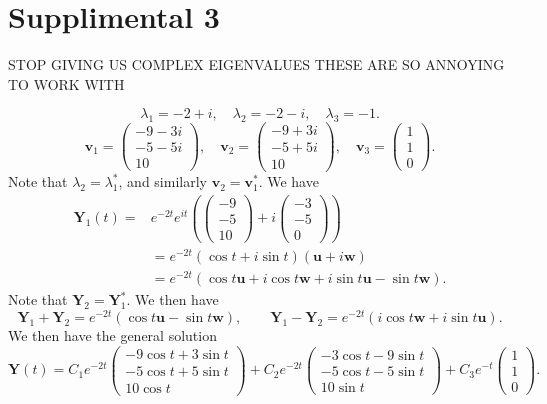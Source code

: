 \documentclass[11pt, letterpaper]{report}
\begin{document}
\section*{Supplimental 3}
STOP GIVING US COMPLEX EIGENVALUES THESE ARE SO ANNOYING TO WORK WITH

\[
	\lambda_1=-2+i,\quad \lambda _2=-2-i,\quad \lambda _3=-1
.\]
\[
	\mathbf{v}_1=\begin{pmatrix}
		-9-3i\\
		-5-5i\\
		10
	\end{pmatrix} ,\quad \mathbf{v}_2=\begin{pmatrix}
		-9+3i\\
		-5+5i\\
		10
	\end{pmatrix},\quad \mathbf{v}_3=\begin{pmatrix}
		1\\
		1\\
		0
	\end{pmatrix} 
.\]
Note that $\lambda_2=\lambda_1^*$, and similarly $\mathbf{v}_2=\mathbf{v}_1^*$. We have
\begin{align*}
	\mathbf{Y}_1(t)=&e^{-2t}e^{it}\left( \begin{pmatrix}
		-9\\
		-5\\
		10
	\end{pmatrix} +i\begin{pmatrix}
		-3\\
		-5\\
		0
\end{pmatrix}  \right)\\
			&=e^{-2t}\left( \cos t+i\sin t \right) \left( \mathbf{u}+i\mathbf{w} \right)\\
&=e^{-2t}\left( \cos t \mathbf{u}+ i\cos t \mathbf{w}+i\sin t \mathbf{u}-\sin t \mathbf{w} \right) 
.\end{align*}
Note that $\mathbf{Y}_2=\mathbf{Y}_1^*$. We then have
\[
	\mathbf{Y}_1+\mathbf{Y}_2=e^{-2t}\left( \cos t \mathbf{u}-\sin t \mathbf{w} \right) ,\qquad \mathbf{Y}_1 - \mathbf{Y}_2 = e^{-2t}\left( i\cos t \mathbf{w}+i\sin t \mathbf{u} \right) 
.\]
We then have the general solution
\[
	\mathbf{Y}(t)=C_1 e^{-2t}\begin{pmatrix}
		-9\cos t+3\sin t\\
		-5\cos t+5\sin t\\
		10\cos t
	\end{pmatrix} +C_2 e^{-2t}\begin{pmatrix}
		-3\cos t-9\sin t\\
		-5\cos t-5\sin t\\
		10\sin t
	\end{pmatrix} +C_3 e^{-t}\begin{pmatrix}
		1\\
		1\\
		0
	\end{pmatrix} 
.\]
\end{document}
